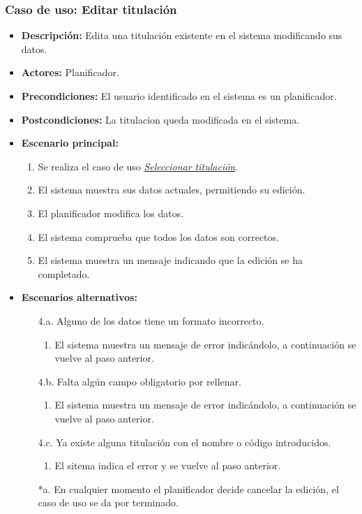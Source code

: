 \subsubsection*{Caso de uso: Editar titulación}
\begin{itemize}
\item{\bf Descripción:} Edita una titulación existente en el sistema modificando sus datos.
\item{\bf Actores:} Planificador.
\item{\bf Precondiciones:} El usuario identificado en el sistema es un planificador.
\item{\bf Postcondiciones:} La titulacion queda modificada en el sistema.
\item{\bf Escenario principal:}
\begin{enumerate}
	\item Se realiza el caso de uso {\em\hyperref[select_titulacion]{Seleccionar titulación}}.
	\item El sistema muestra sus datos actuales, permitiendo su edición.
	\item El planificador modifica los datos.
	\item El sistema comprueba que todos los datos son correctos.
	\item El sistema muestra un mensaje indicando que la edición se ha completado.
\end{enumerate}
\item{\bf Escenarios alternativos:}
	\begin{itemize}
	\item[4.a.] Alguno de los datos tiene un formato incorrecto.
		\begin{enumerate}
		\item El sistema muestra un mensaje de error indicándolo, a continuación se vuelve al paso anterior.
		\end{enumerate}
	\item[4.b.] Falta algún campo obligatorio por rellenar.
		\begin{enumerate}
		\item El sistema muestra un mensaje de error indicándolo, a continuación se vuelve al paso anterior.
		\end{enumerate}
	\item[4.c.] Ya existe alguna titulación con el nombre o código introducidos.
		\begin{enumerate}
		\item El sitema indica el error y se vuelve al paso anterior.
		\end{enumerate}
	\item[*a.] En cualquier momento el planificador decide cancelar la edición, el caso de uso se da por terminado.
	\end{itemize}
\end{itemize}



